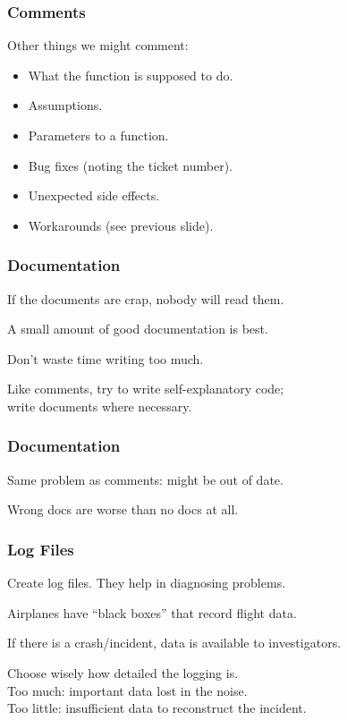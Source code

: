 \begin{frame}
\frametitle{Comments}
\begin{changemargin}{1cm}
Other things we might comment:

\begin{itemize}
	\item What the function is supposed to do.
	\item Assumptions.
	\item Parameters to a function.
	\item Bug fixes (noting the ticket number).
	\item Unexpected side effects.
	\item Workarounds (see previous slide).
\end{itemize}


\end{changemargin}
\end{frame}


\begin{frame}
\frametitle{Documentation}
\begin{changemargin}{1cm}
If the documents are crap, nobody will read them.

A small amount of good documentation is best.

Don't waste time writing too much.

Like comments, try to write self-explanatory code;\\
\quad write documents where necessary.

\end{changemargin}
\end{frame}

\begin{frame}
\frametitle{Documentation}
\begin{changemargin}{1cm}
Same problem as comments: might be out of date.

Wrong docs are worse than no docs at all.
\end{changemargin}
\end{frame}

\begin{frame}
\frametitle{Log Files}
\begin{changemargin}{1cm}
Create log files. They help in diagnosing problems.

Airplanes have ``black boxes'' that record flight data.

If there is a crash/incident, data is available to investigators.

Choose wisely how detailed the logging is.\\
\quad Too much: important data lost in the noise.\\
\quad Too little: insufficient data to reconstruct the incident.


\end{changemargin}
\end{frame}

